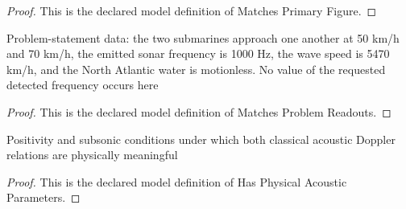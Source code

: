 \begin{proof}
  This is the declared model definition of Matches Primary Figure.
\end{proof}
\begin{definition}
  \label{def:physics:phyx-mini-0319:phyxminiproblems-problemphyxmini0319-matchesproblemreadouts}
  Problem-statement data: the two submarines approach one another at 50 km/h and 70 km/h, the emitted sonar frequency is 1000 Hz, the wave speed is 5470 km/h, and the North Atlantic water is motionless. No value of the requested detected frequency occurs here
\end{definition}
\begin{proof}
  This is the declared model definition of Matches Problem Readouts.
\end{proof}
\begin{definition}
  \label{def:physics:phyx-mini-0319:phyxminiproblems-problemphyxmini0319-hasphysicalacousticparameters}
  Positivity and subsonic conditions under which both classical acoustic Doppler relations are physically meaningful
\end{definition}
\begin{proof}
  This is the declared model definition of Has Physical Acoustic Parameters.
\end{proof}
